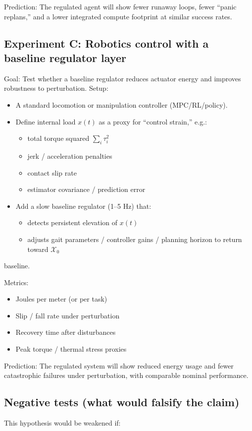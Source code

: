 \documentclass[11pt]{article}
\begin{document}
Prediction: The regulated agent will show fewer runaway loops, fewer “panic replans,” and a lower integrated compute footprint at similar success rates.

\subsection{Experiment C: Robotics control with a baseline regulator layer}
Goal: Test whether a baseline regulator reduces actuator energy and improves robustness to perturbation. Setup:

\begin{itemize}
\item A standard locomotion or manipulation controller (MPC/RL/policy).
\item Define internal load \(x(t)\) as a proxy for “control strain,” e.g.:
\begin{itemize}
\item total torque squared \(\sum_i \tau_i^2\)
\item jerk / acceleration penalties
\item contact slip rate
\item estimator covariance / prediction error
\end{itemize}
\item Add a slow baseline regulator (1--5 Hz) that:
\begin{itemize}
\item detects persistent elevation of \(x(t)\)
\item adjusts gait parameters / controller gains / planning horizon to return toward \(\mathcal{X}_0\)
\end{itemize}
\end{itemize}

baseline.

Metrics:

\begin{itemize}
\item Joules per meter (or per task)
\item Slip / fall rate under perturbation
\item Recovery time after disturbances
\item Peak torque / thermal stress proxies
\end{itemize}

Prediction: The regulated system will show reduced energy usage and fewer catastrophic failures under perturbation, with comparable nominal performance.

\subsection{Negative tests (what would falsify the claim)}
This hypothesis would be weakened if:
\end{document}

